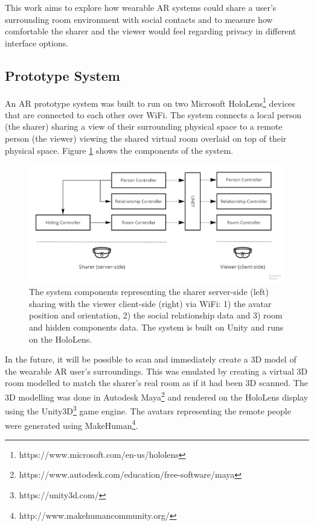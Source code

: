 This work aims to explore how wearable AR systems could share a user's surrounding room environment with social contacts and to measure how comfortable the sharer and the viewer would feel regarding privacy in different interface options. 

\subsection{Prototype System}

An AR prototype system was built to run on two Microsoft HoloLens\footnote{https://www.microsoft.com/en-us/hololens} devices that are connected to each other over WiFi. The system connects a local person (the sharer) sharing a view of their surrounding physical space to a remote person (the viewer) viewing the shared virtual room overlaid on top of their physical space. Figure \ref{fig:frontier18:system} shows the components of the system.

\begin{figure}[H]
    \begin{center}
    \includegraphics[width=\linewidth]{images/frontier18/system.jpg}
    \caption{The system components representing the sharer server-side (left) sharing with the viewer client-side (right) via WiFi: 1) the avatar position and orientation, 2) the social relationship data and 3) room and hidden components data. The system is built on Unity and runs on the HoloLens.}\label{fig:frontier18:system}
    \end{center}
\end{figure}

In the future, it will be possible to scan and immediately create a 3D model of the wearable AR user's surroundings. This was emulated by creating a virtual 3D room modelled to match the sharer's real room as if it had been 3D scanned.  The 3D modelling was done in Autodesk Maya\footnote{https://www.autodesk.com/education/free-software/maya} and rendered on the HoloLens display using the Unity3D\footnote{https://unity3d.com/} game engine. The avatars representing the remote people were generated using MakeHuman\footnote{http://www.makehumancommunity.org/}.

